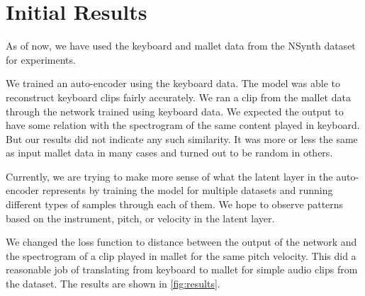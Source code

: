 \documentclass{article}
\begin{document}
\section{Initial Results}

As of now, we have used the keyboard and mallet data from the NSynth dataset for experiments.

We trained an auto-encoder using the keyboard data. The model was able to reconstruct keyboard clips fairly accurately. We ran a clip from the mallet data through the network trained using keyboard data. We expected the output to have some relation with the spectrogram of the same content played in keyboard. But our results did not indicate any such similarity. It was more or less the same as input mallet data in many cases and turned out to be random in others.

Currently, we are trying to make more sense of what the latent layer in the auto-encoder represents by training the model for multiple datasets and running different types of samples through each of them. We hope to observe patterns based on the instrument, pitch, or velocity in the latent layer.

We changed the loss function to distance between the output of the network and the spectrogram of a clip played in mallet for the same pitch velocity. This did a reasonable job of translating from keyboard to mallet for simple audio clips from the dataset. The results are shown in \ref{fig:results}.
\end{document}
